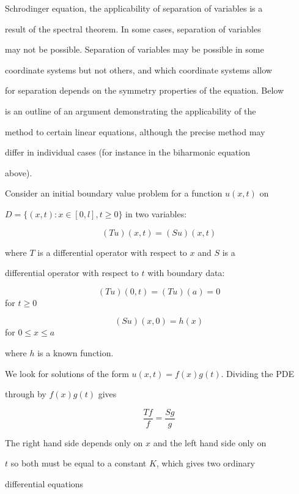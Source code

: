 Schrodinger equation, the applicability of separation of variables is a

result of the spectral theorem. In some cases, separation of variables

may not be possible. Separation of variables may be possible in some

coordinate systems but not others, and which coordinate systems allow

for separation depends on the symmetry properties of the equation. Below

is an outline of an argument demonstrating the applicability of the

method to certain linear equations, although the precise method may

differ in individual cases (for instance in the biharmonic equation

above).



Consider an initial boundary value problem for a function $u(x,t)$ on

$D = \{(x,t): x \in [0,l], t \geq 0 \}$ in two variables:



$$(Tu)(x,t) = (Su)(x,t)$$



where $T$ is a differential operator with respect to $x$ and $S$ is a

differential operator with respect to $t$ with boundary data:



$$(Tu)(0,t) = (Tu)(a) = 0$$ for $t \geq 0$



$$(Su)(x,0)=h(x)$$ for $0 \leq x \leq a$



where $h$ is a known function.



We look for solutions of the form $u(x,t) = f(x) g(t)$. Dividing the PDE

through by $f(x)g(t)$ gives



$$\frac{Tf}{f} = \frac{Sg}{g}$$



The right hand side depends only on $x$ and the left hand side only on

$t$ so both must be equal to a constant $K$, which gives two ordinary

differential equations



